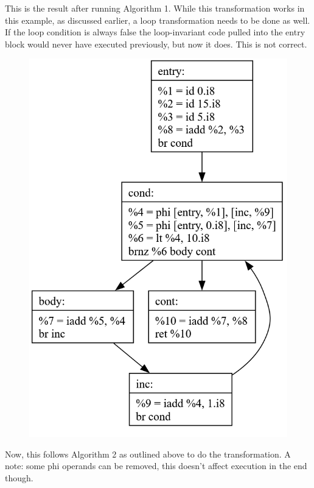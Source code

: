 \documentclass[11pt, a4paper, titlepage]{article}
\begin{document}
This is the result after running Algorithm 1. While this transformation works in this example, as discussed earlier, a loop transformation needs to be done as well. If the loop condition is always false the loop-invariant code pulled into the entry block would never have executed previously, but now it does. This is not correct.

\begin{figure}[H]
  \centering
  \includegraphics[scale=0.3]{images/i25.png}
\end{figure}

Now, this follows Algorithm 2 as outlined above to do the transformation. A note: some phi operands can be removed, this doesn't affect execution in the end though.
\end{document}
